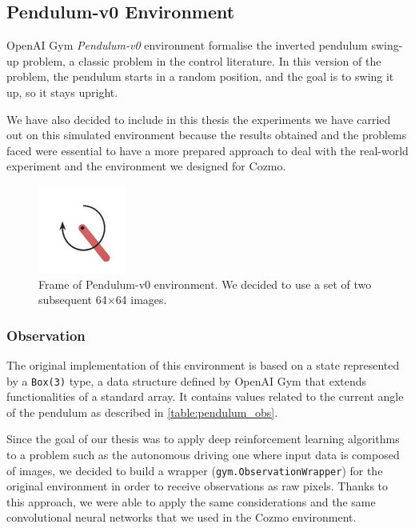 \subsection{Pendulum-v0 Environment}

OpenAI Gym \textit{Pendulum-v0} environment formalise the inverted pendulum swing-up problem, a classic problem in the control literature.
In this version of the problem, the pendulum starts in a random position, and the goal is to swing it up, so it stays upright.

We have also decided to include in this thesis the experiments we have carried out on this simulated environment because the results obtained and the problems faced were essential to have a more prepared approach to deal with the real-world experiment and the environment we designed for Cozmo.

\begin{figure}[ht!]
    \centering
    \includegraphics[height=0.2\paperwidth]{img/pendulum.png}
    \caption[Frame of Pendulum-v0 environment]{Frame of Pendulum-v0 environment.
        We decided to use a set of two subsequent 64$\times$64 images.}
    \label{fig:pendulum}
\end{figure}

\subsubsection{Observation}

The original implementation of this environment is based on a state represented by a \texttt{Box(3)} type, a data structure defined by OpenAI Gym that extends functionalities of a standard array.
It contains values related to the current angle of the pendulum as described in \vref{table:pendulum_obs}.

Since the goal of our thesis was to apply deep reinforcement learning algorithms to a problem such as the autonomous driving one where input data is composed of images, we decided to build a wrapper (\texttt{gym.ObservationWrapper}) for the original environment in order to receive observations as raw pixels.
Thanks to this approach, we were able to apply the same considerations and the same convolutional neural networks that we used in the Cozmo environment.

